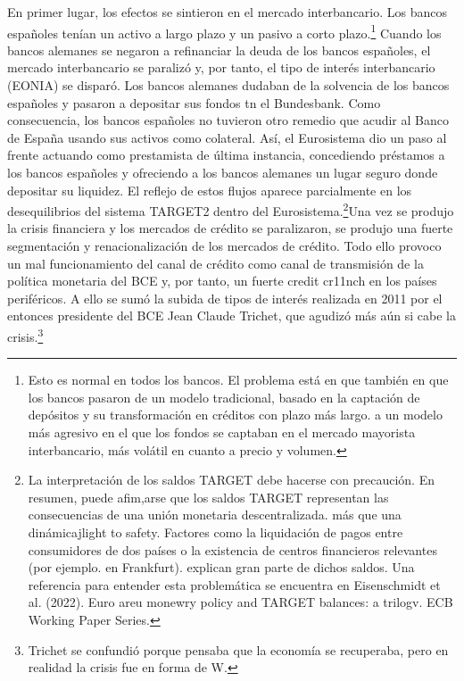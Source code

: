\documentclass[10pt,a4paper]{article}
\begin{document}
En primer lugar, los efectos se sintieron en el mercado interbancario. Los bancos españoles tenían un activo a largo plazo y un pasivo a corto plazo.\footnote{%
    Esto es normal en todos los bancos. El problema está en que también en que los bancos pasaron de un modelo tradicional, basado en la captación de depósitos y su transformación en créditos con plazo más largo. a un modelo más agresivo en el que los fondos se captaban en el mercado mayorista interbancario, más volátil en cuanto a precio y volumen.
} Cuando los bancos alemanes se negaron a refinanciar la deuda de los bancos españoles, el mercado interbancario se paralizó y, por tanto, el tipo de interés interbancario (EONIA) se disparó. Los bancos alemanes dudaban de la solvencia de los bancos españoles y pasaron a depositar sus fondos tn el Bundesbank. Como consecuencia, los bancos españoles no tuvieron otro remedio que acudir al Banco de España usando sus activos como colateral. Así, el Eurosistema dio un paso al frente actuando como prestamista de última instancia, concediendo préstamos a los bancos españoles y ofreciendo a los bancos alemanes un  lugar seguro donde depositar su liquidez. El reflejo de estos flujos aparece parcialmente en los desequilibrios del sistema TARGET2 dentro del Eurosistema.\footnote{%
    La interpretación de los saldos TARGET debe hacerse con precaución. En resumen, puede afim,arse que los saldos TARGET representan las consecuencias de una unión monetaria descentralizada. más que una dinámicajlight to safety. Factores como la liquidación de pagos entre consumidores de dos países o la existencia de centros financieros relevantes (por ejemplo. en Frankfurt). explican gran parte de dichos saldos. Una referencia para entender esta problemática se encuentra en Eisenschmidt et al. (2022). Euro areu monewry policy and TARGET balances: a trilogv. ECB Working Paper Series.
}Una vez se produjo la crisis financiera y los mercados de crédito se paralizaron, se produjo una fuerte segmentación y renacionalización de los mercados de crédito. Todo ello provoco un mal funcionamiento del canal de crédito como canal de transmisión de la política monetaria del BCE y, por tanto, un fuerte credit cr11nch en los países periféricos. A ello se sumó la subida de tipos de interés realizada en 2011 por el entonces presidente del BCE Jean Claude Trichet, que agudizó más aún si cabe la crisis.\footnote{%
    Trichet se confundió porque pensaba que la economía se recuperaba, pero en realidad la crisis fue en forma de W.
}
\end{document}
